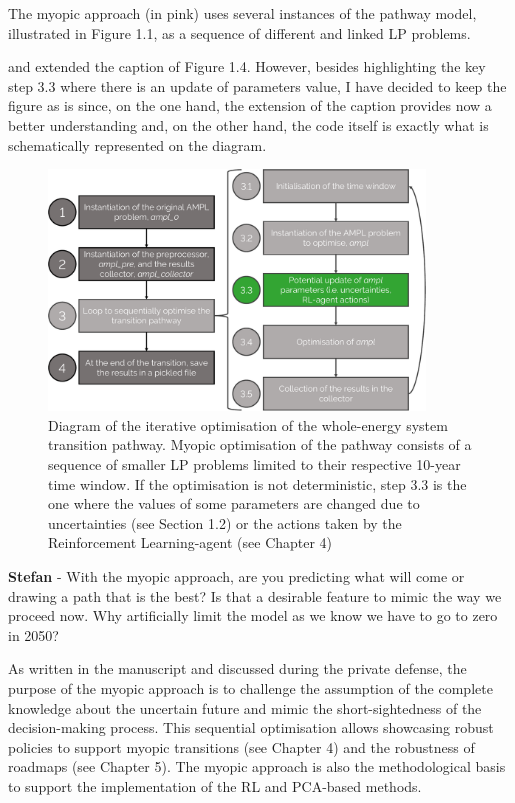 \documentclass[12pt,a4paper]{article}
\begin{document}
\begin{mdframed}[style=manuscript] %
The myopic approach (in pink) uses several instances of the pathway model, illustrated in Figure 1.1, as a sequence of different and linked LP problems. 
\end{mdframed}

\noindent and extended the caption of {\color{blue} Figure 1.4}. However, besides highlighting the key step 3.3 where there is an update of parameters value, I have decided to keep the figure as is since, on the one hand, the extension of the caption provides now a better understanding and, on the other hand, the code itself is exactly what is schematically represented on the diagram. 

\begin{figure}[htbp!]
\centering
\includegraphics[width=10cm]{MY_process_code.pdf}
\caption{Diagram of the iterative optimisation of the whole-energy system transition pathway. Myopic optimisation of the pathway consists of a sequence of smaller LP problems limited to their respective 10-year time window. If the optimisation is not deterministic, step 3.3 is the one where the values of some parameters are changed due to uncertainties (see Section 1.2) or the actions taken by the Reinforcement Learning-agent (see Chapter 4)}
\label{fig:MY_process_code}
\end{figure}

\begin{mdframed}[style=comment] %
{\color{teal} \textbf{Stefan}} - With the myopic approach, are you predicting what will come or drawing a path that is the best? Is that a desirable feature to mimic the way we proceed now. Why artificially limit the model as we know we have to go to zero in 2050?
\end{mdframed}

\noindent As written in the manuscript and discussed during the private defense, the purpose of the myopic approach is to challenge the assumption of the complete knowledge about the uncertain future and mimic the short-sightedness of the decision-making process. This sequential optimisation allows showcasing robust policies to support myopic transitions (see Chapter 4) and the robustness of roadmaps (see Chapter 5). The myopic approach is also the methodological basis to support the implementation of the RL and PCA-based methods. 
\end{document}
